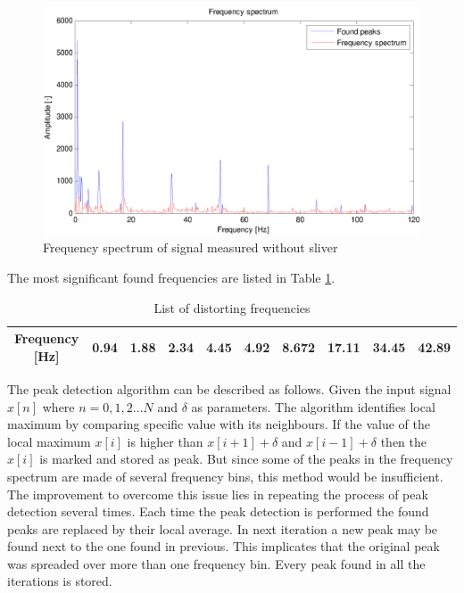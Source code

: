 \documentclass[twoside]{ctuthesis}
\theoremstyle{plain}
\theoremstyle{definition}
\theoremstyle{note}
\begin{document}
\begin{figure}[h]
	\centering
	\includegraphics[width=1.0\textwidth]{withoutMat_foundPeaks_half.eps}
	\caption{Frequency spectrum of signal measured without sliver}
	\label{fig:withoutMat_foundPeaks}
\end{figure}

The most significant found frequencies are listed in Table \ref{tab:DistortinFreq}.%
\begin{table}[htbp]
	\centering
	\caption{List of distorting frequencies}
	\begin{tabular}{crrrrrrrrr}
		\midrule
		Frequency [Hz]  & 0.94  & 1.88   & 2.34 & 4.45   & 4.92  & 8.672  & 17.11   & 34.45 & 42.89 \\
		
		\bottomrule
	\end{tabular}%
	\label{tab:DistortinFreq}%
\end{table}%

The peak detection algorithm can be described as follows. Given the input signal $x[n]$ where $n=0,1,2\ldots N$ and $\delta$ as parameters. The algorithm identifies local maximum by comparing specific value with its neighbours. If the value of the local maximum $x[i]$ is higher than $x[i+1] + \delta $ and $x[i-1] + \delta$ then the $x[i]$ is marked and stored as peak.
But since some of the peaks in the frequency spectrum are made of several frequency bins, this method would be insufficient. The improvement to overcome this issue lies in repeating the process of peak detection several times. Each time the peak detection is performed the found peaks are replaced by their local average. In next iteration a new peak may be found next to the one found in previous. This implicates that the original peak was spreaded over more than one frequency bin. Every peak found in all the iterations is stored.
\end{document}

